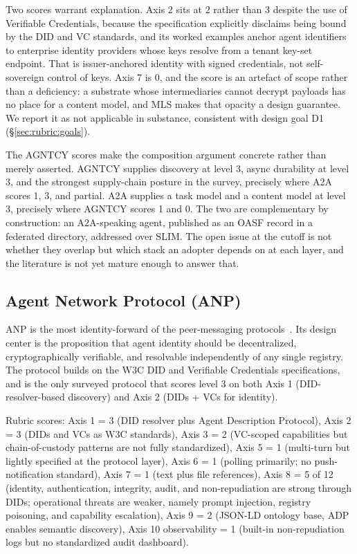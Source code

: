 Two scores warrant explanation. Axis 2 sits at 2 rather
than 3 despite the use of Verifiable Credentials, because
the specification explicitly disclaims being bound by the
DID and VC standards, and its worked examples anchor agent
identifiers to enterprise identity providers whose keys
resolve from a tenant key-set endpoint. That is
issuer-anchored identity with signed credentials, not
self-sovereign control of keys. Axis 7 is 0, and the score
is an artefact of scope rather than a deficiency: a
substrate whose intermediaries cannot decrypt payloads has
no place for a content model, and MLS makes that opacity a
design guarantee. We report it as not applicable in
substance, consistent with design goal D1
(\S\ref{sec:rubric:goals}).

The AGNTCY scores make the composition argument concrete
rather than merely asserted. AGNTCY supplies discovery at
level 3, async durability at level 3, and the strongest
supply-chain posture in the survey, precisely where A2A
scores 1, 3, and partial. A2A supplies a task model and a
content model at level 3, precisely where AGNTCY scores 1
and 0. The two are complementary by construction: an
A2A-speaking agent, published as an OASF record in a
federated directory, addressed over SLIM. The open issue at
the cutoff is not whether they overlap but which stack an
adopter depends on at each layer, and the literature is not
yet mature enough to answer that.

\subsection{Agent Network Protocol (ANP)}
\label{sec:industry:anp}

ANP is the most identity-forward of the peer-messaging
protocols~\cite{spec_anp}. Its design center is the
proposition that agent identity should be decentralized,
cryptographically verifiable, and resolvable independently
of any single registry. The protocol builds on the W3C
DID and Verifiable Credentials specifications, and is the
only surveyed protocol that scores level 3 on both
Axis 1 (DID-resolver-based discovery) and Axis 2 (DIDs +
VCs for identity).

Rubric scores: Axis 1 = 3 (DID resolver plus Agent
Description Protocol), Axis 2 = 3 (DIDs and VCs as W3C
standards), Axis 3 = 2 (VC-scoped capabilities but
chain-of-custody patterns are not fully standardized),
Axis 5 = 1 (multi-turn but lightly specified at the
protocol layer), Axis 6 = 1 (polling primarily; no
push-notification standard), Axis 7 = 1 (text plus file
references), Axis 8 = 5 of 12 (identity, authentication,
integrity, audit, and non-repudiation are strong through
DIDs; operational threats are weaker, namely prompt
injection, registry poisoning, and capability escalation),
Axis 9 = 2 (JSON-LD ontology base, ADP enables semantic
discovery), Axis 10 observability = 1 (built-in
non-repudiation logs but no standardized audit dashboard).

